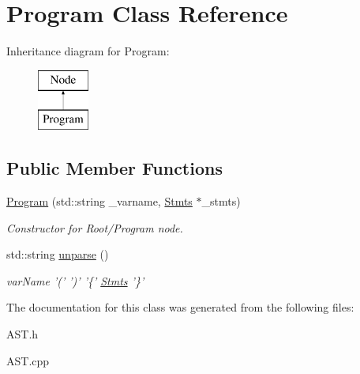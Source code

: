 \hypertarget{classProgram}{\section{Program Class Reference}
\label{classProgram}
}
Inheritance diagram for Program\-:\begin{figure}[H]
\begin{center}
\leavevmode
\includegraphics[height=2.000000cm]{classProgram}
\end{center}
\end{figure}
\subsection*{Public Member Functions}
\begin{DoxyCompactItemize}
\item 
\hypertarget{classProgram_a0fe9e8c0aab485a521a899c9e651e8b5}{\hyperlink{classProgram_a0fe9e8c0aab485a521a899c9e651e8b5}{Program} (std\-::string \-\_\-varname, \hyperlink{classStmts}{Stmts} $\ast$\-\_\-stmts)}\label{classProgram_a0fe9e8c0aab485a521a899c9e651e8b5}

\begin{DoxyCompactList}\small\item\em Constructor for Root/\-Program node. \end{DoxyCompactList}\item 
\hypertarget{classProgram_a33c78e36a63c63e5821b7747bec7b644}{std\-::string \hyperlink{classProgram_a33c78e36a63c63e5821b7747bec7b644}{unparse} ()}\label{classProgram_a33c78e36a63c63e5821b7747bec7b644}

\begin{DoxyCompactList}\small\item\em var\-Name '(' ')' '\{' \hyperlink{classStmts}{Stmts} '\}' \end{DoxyCompactList}\end{DoxyCompactItemize}


The documentation for this class was generated from the following files\-:\begin{DoxyCompactItemize}
\item 
A\-S\-T.\-h\item 
A\-S\-T.\-cpp\end{DoxyCompactItemize}

